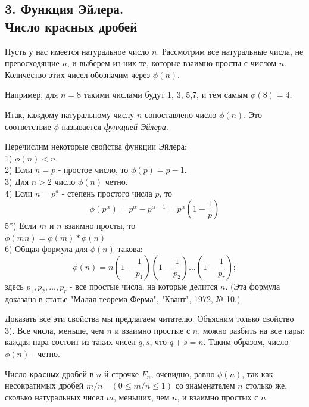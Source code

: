 \begin{multicols*}{2}
\section*{3. Функция Эйлера.\\Число красных дробей}
{\large
Пусть у нас имеется натуральное число $n$. Рассмотрим все натуральные числа, не превосходящие $n$, и выберем из них те, которые взаимно просты с числом $n$. Количество этих чисел обозначим через $\phi(n)$.

Например, для $n=8$ такими числами будут 1, 3, 5,7, и тем самым $\phi(8)=4$.

Итак, каждому натуральному числу $n$ сопоставлено число $\phi(n)$. Это соответствие $\phi$ называется \textit{функцией Эйлера}.

Перечислим некоторые свойства функции Эйлера:\\
1) $\phi(n) < n$.\\
2) Если $n = p$ - простое число, то $\phi(p) = p - 1$.\\
3) Для $n > 2$ число $\phi(n)$ четно.\\
4) Если $n = p^d$ - степень простого числа $p$, то
\[
\phi(p^\alpha) = p^\alpha - p^{\alpha-1} = p^\alpha\left(1 - \frac{1}{p}\right)
\]
5*) Если $m$ и $n$ взаимно просты, то\\ $\phi(mn) = \phi(m)*\phi(n)$\\
6) Общая формула для $\phi(n)$ такова:
\[
\phi(n) = n\left(1 - \frac{1}{p_1}\right)\left(1 - \frac{1}{p_2}\right)\dots\left(1 - \frac{1}{p_r}\right);
\]
здесь $p_1, p_2, \dots, p_r$ - все простые числа, на которые делится $n$. (Эта формула доказана в статье "Малая теорема Ферма", "Квант", 1972, № 10.)

Доказать все эти свойства мы предлагаем читателю. Объясним только свойство 3). Все числа, меньше, чем $n$ и взаимно простые с $n$, можно разбить на все пары: каждая пара состоит из таких чисел $q, s$, что $q+s=n$. Таким образом, число $\phi(n)$ - четно.

Число \texttt{красных} дробей в $n$-й строчке $F_n$, очевидно, равно $\phi(n)$, так как несократимых дробей $m/n\quad (0\le m/n\le 1)$ со знаменателем $n$ столько же, сколько натуральных чисел $m$, меньших, чем $n$, и взаимно простых с $n$.

}
\end{multicols*}
